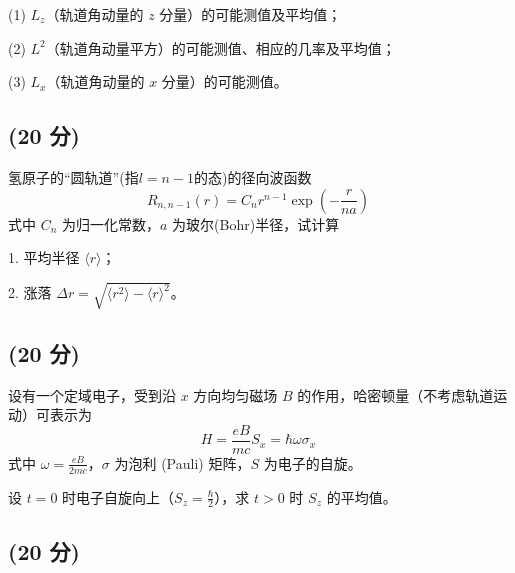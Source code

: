 (1) $L_z$（轨道角动量的 $z$ 分量）的可能测值及平均值；

(2) $L^2$（轨道角动量平方）的可能测值、相应的几率及平均值；

(3) $L_x$（轨道角动量的 $x$ 分量）的可能测值。
\subsection{(20 分)}
氢原子的“圆轨道”(指$l=n-1$的态)的径向波函数
$$R_{n,n-1}(r) = C_n r^{n-1} \exp\left( -\frac{r}{na} \right)~$$
式中 $C_n$ 为归一化常数，$a$ 为玻尔(Bohr)半径，试计算

1. 平均半径 $\langle r \rangle$；

2. 涨落 $\Delta r = \sqrt{\langle r^2 \rangle - \langle r \rangle^2}$。
\subsection{(20 分)}
设有一个定域电子，受到沿 $x$ 方向均匀磁场 $B$ 的作用，哈密顿量（不考虑轨道运动）可表示为
\[H = \frac{eB}{mc} S_x = \hbar \omega \sigma_x~\]
式中 \(\omega = \frac{eB}{2mc}\)，\(\sigma\) 为泡利 (Pauli) 矩阵，\(S\) 为电子的自旋。

设 \(t = 0\) 时电子自旋向上（\(S_z = \frac{\hbar}{2}\)），求 \(t > 0\) 时 \(S_z\) 的平均值。
\subsection{(20 分)}